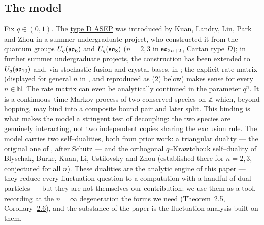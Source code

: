 \documentclass[11pt]{article}
\theoremstyle{plain}
\theoremstyle{definition}
\theoremstyle{remark}
\newcommand{\Z}{\mathbb{Z}}\newcommand{\R}{\mathbb{R}}\newcommand{\N}{\mathbb{N}}
\begin{document}
\subsection{The model}\label{sec_intromodel}
Fix $q\in(0,1)$. The \underline{type D ASEP} was introduced by Kuan, Landry, Lin, Park and
Zhou \cite{KLLPZ} in a summer undergraduate project, who constructed it from the quantum groups $U_q(\mathfrak{so}_6)$ and
$U_q(\mathfrak{so}_8)$ ($n=2,3$ in $\mathfrak{so}_{2n+2}$, Cartan type $D$); in further summer undergraduate projects, the construction has been extended to $U_q(\mathfrak{so}_{10})$ \cite{RSL} and, via stochastic fusion and crystal bases, in
\cite{BEPS}; the explicit rate matrix (displayed for general $n$ in \cite[\S2.1]{REU},
and reproduced as \hyperref[eq_nrates]{(2)} below) makes sense for every $n\in\N$. The rate matrix can even be analytically continued in the parameter $q^n$. It is a continuous--time Markov process of two conserved species on $\Z$ which, beyond
hopping, may bind into a composite \underline{bound pair} and later split. This binding is
what makes the model a stringent test of decoupling: the two species are genuinely
interacting, not two independent copies sharing the exclusion rule. The model carries
two self--dualities, both from prior work: a \underline{triangular} duality --- the
original one of \cite{KLLPZ}, after Sch\"utz \cite{SchutzDual} --- and the orthogonal
$q$--Krawtchouk self--duality of Blyschak, Burke, Kuan, Li, Ustilovsky and Zhou
\cite{REU} (established there for $n=2,3$, conjectured for all $n$). These dualities
are the analytic engine of this paper --- they reduce every fluctuation question to a
computation with a handful of dual particles --- but they are not themselves our
contribution: we use them as a tool, recording at the $n=\infty$ degeneration the
forms we need (Theorem~\hyperref[thm_dual]{2.5}, Corollary~\hyperref[cor_tri]{2.6}), and the substance of
the paper is the fluctuation analysis built on them.
\end{document}
